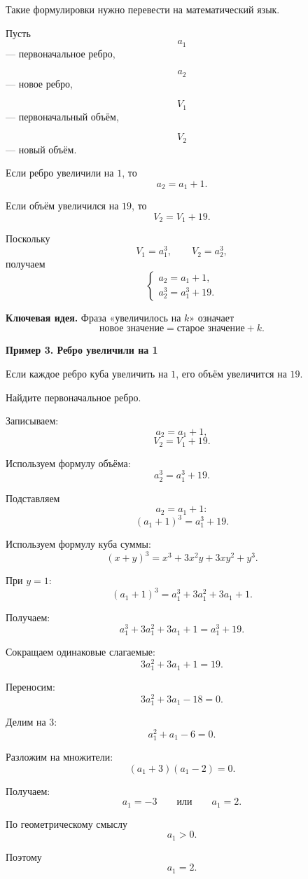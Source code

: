 \documentclass[a4paper,12pt]{article}
\newcommand{\subsectiontitle}[1]{%
    \vspace{0.4em}
    {\large\bfseries\color{darkaccent}#1}\par
    \vspace{0.2em}
}
\newcommand{\keyidea}[1]{%
    \par\medskip
    {\bfseries\color{darkaccent}Ключевая идея.} #1
    \par\medskip
}
\begin{document}
Такие формулировки нужно перевести на математический язык.

Пусть
\[
a_1
\]
--- первоначальное ребро,

\[
a_2
\]
--- новое ребро,

\[
V_1
\]
--- первоначальный объём,

\[
V_2
\]
--- новый объём.

Если ребро увеличили на \(1\), то
\[
\boxed{a_2=a_1+1}.
\]

Если объём увеличился на \(19\), то
\[
\boxed{V_2=V_1+19}.
\]

Поскольку
\[
V_1=a_1^3,
\qquad
V_2=a_2^3,
\]
получаем
\[
\begin{cases}
a_2=a_1+1,\\[2mm]
a_2^3=a_1^3+19.
\end{cases}
\]

\keyidea{
Фраза «увеличилось на \(k\)» означает
\[
\text{новое значение}
=
\text{старое значение}+k.
\]
}

\subsectiontitle{Пример 3. Ребро увеличили на 1}

Если каждое ребро куба увеличить на \(1\),
его объём увеличится на \(19\).

Найдите первоначальное ребро.

Записываем:
\[
a_2=a_1+1,
\]
\[
V_2=V_1+19.
\]

Используем формулу объёма:
\[
a_2^3=a_1^3+19.
\]

Подставляем
\[
a_2=a_1+1:
\]
\[
(a_1+1)^3=a_1^3+19.
\]

Используем формулу куба суммы:
\[
(x+y)^3
=
x^3+3x^2y+3xy^2+y^3.
\]

При \(y=1\):
\[
(a_1+1)^3
=
a_1^3+3a_1^2+3a_1+1.
\]

Получаем:
\[
a_1^3+3a_1^2+3a_1+1
=
a_1^3+19.
\]

Сокращаем одинаковые слагаемые:
\[
3a_1^2+3a_1+1=19.
\]

Переносим:
\[
3a_1^2+3a_1-18=0.
\]

Делим на \(3\):
\[
a_1^2+a_1-6=0.
\]

Разложим на множители:
\[
(a_1+3)(a_1-2)=0.
\]

Получаем:
\[
a_1=-3
\qquad\text{или}\qquad
a_1=2.
\]

По геометрическому смыслу
\[
a_1>0.
\]

Поэтому
\[
\boxed{a_1=2}.
\]

\clearpage
\thispagestyle{fancy}
\end{document}
